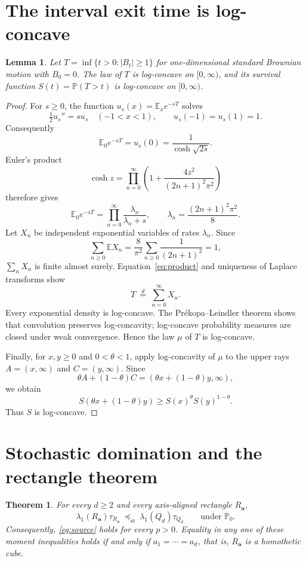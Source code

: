 \documentclass[10pt]{article}
\newtheorem{theorem}{Theorem}
\newtheorem{lemma}{Lemma}
\newcommand{\E}{\mathbb E}
\newcommand{\Pp}{\mathbb P}
\newcommand{\st}{\preceq_{\mathrm{st}}}
\begin{document}
\section{The interval exit time is log-concave}

\begin{lemma}\label{lem:logconcave}
Let $T=\inf\{t>0:|B_t|\ge1\}$ for one-dimensional standard Brownian motion
with $B_0=0$.  The law of $T$ is log-concave on $[0,\infty)$, and its survival
function $S(t)=\Pp(T>t)$ is log-concave on $[0,\infty)$.
\end{lemma}

\begin{proof}
For $s\ge0$, the function $u_s(x)=\E_x e^{-sT}$ solves
\[
 \tfrac12u_s''=su_s\quad(-1<x<1),\qquad u_s(-1)=u_s(1)=1.
\]
Consequently
\[
 \E_0e^{-sT}=u_s(0)=\frac1{\cosh\sqrt{2s}}.
\]
Euler's product
\[
 \cosh z=\prod_{n=0}^{\infty}
 \left(1+\frac{4z^2}{(2n+1)^2\pi^2}\right)
\]
therefore gives
\begin{equation}\label{eq:product}
 \E_0e^{-sT}=\prod_{n=0}^{\infty}\frac{\lambda_n}{\lambda_n+s},
 \qquad \lambda_n=\frac{(2n+1)^2\pi^2}{8}.
\end{equation}
Let $X_n$ be independent exponential variables of rates $\lambda_n$.  Since
\[
 \sum_{n\ge0}\E X_n=\frac8{\pi^2}
 \sum_{n\ge0}\frac1{(2n+1)^2}=1,
\]
$\sum_nX_n$ is finite almost surely.  Equation~\eqref{eq:product} and
uniqueness of Laplace transforms show
\[
 T\ \stackrel{d}=\ \sum_{n=0}^{\infty}X_n.
\]
Every exponential density is log-concave.  The Prékopa--Leindler theorem
shows that convolution preserves log-concavity; log-concave probability
measures are closed under weak convergence.  Hence the law $\mu$ of $T$ is
log-concave.

Finally, for $x,y\ge0$ and $0<\theta<1$, apply log-concavity of $\mu$ to the
upper rays $A=(x,\infty)$ and $C=(y,\infty)$.  Since
\[
 \theta A+(1-\theta)C=(\theta x+(1-\theta)y,\infty),
\]
we obtain
\[
 S(\theta x+(1-\theta)y)
 \ge S(x)^\theta S(y)^{1-\theta}.
\]
Thus $S$ is log-concave.
\end{proof}

\section{Stochastic domination and the rectangle theorem}

\begin{theorem}\label{thm:main}
For every $d\ge2$ and every axis-aligned rectangle $R_{\mathbf a}$,
\begin{equation}\label{eq:stoch}
 \lambda_1(R_{\mathbf a})\tau_{R_{\mathbf a}}
 \ \st\
 \lambda_1(Q_d)\tau_{Q_d}
 \qquad\text{under }\Pp_0.
\end{equation}
Consequently, \eqref{eq:source} holds for every $p>0$.  Equality in any one
of these moment inequalities holds if and only if
$a_1=\cdots=a_d$, that is, $R_{\mathbf a}$ is a homothetic cube.
\end{theorem}
\end{document}
